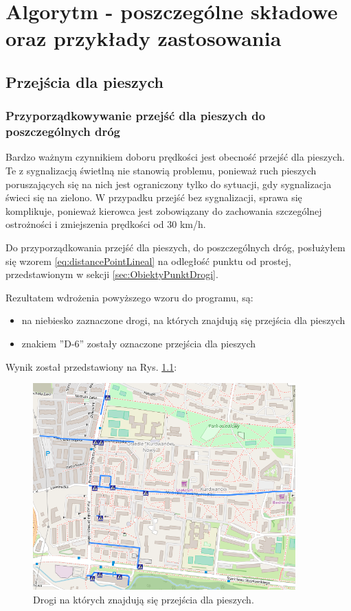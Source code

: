 \chapter{Algorytm - poszczególne składowe oraz przykłady zastosowania}
\label{cha:AlgorytmPraktyka}

\newpage
\section{Przejścia dla pieszych}
\label{sec:pedestrialCrossing}
\subsection{Przyporządkowywanie przejść dla pieszych do poszczególnych dróg}

Bardzo ważnym czynnikiem doboru prędkości jest obecność przejść dla pieszych. Te z sygnalizacją świetlną nie stanowią problemu, ponieważ ruch pieszych poruszających się na nich jest ograniczony tylko do sytuacji, gdy sygnalizacja świeci się na zielono. W przypadku przejść bez sygnalizacji, sprawa się komplikuje, ponieważ kierowca jest zobowiązany do zachowania szczególnej ostrożności i zmiejszenia prędkości od 30 km/h.

Do przyporządkowania przejść dla pieszych, do poszczególnych dróg, posłużyłem się wzorem \ref{eq:distancePointLineal} na odległość punktu od prostej, przedstawionym w sekcji \ref{sec:ObiektyPunktDrogi}.


Rezultatem wdrożenia powyższego wzoru do programu, są:
\begin{itemize}
\item na niebiesko zaznaczone drogi, na których znajdują się przejścia dla pieszych
\item znakiem ''D-6'' zostały oznaczone przejścia dla pieszych
\end{itemize}
Wynik został przedstawiony na Rys. \ref{sec:PrzejscieDrogi}:

\begin{figure}[h]
\caption{Drogi na których znajdują się przejścia dla pieszych.}
\label{sec:PrzejscieDrogi}
\centering
\includegraphics[width=0.9\textwidth]{PrzejscieDrogi}
\end{figure}

